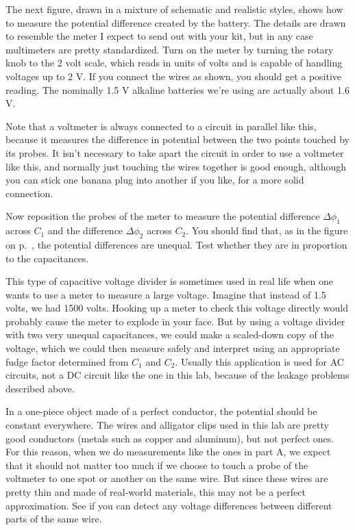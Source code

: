 The next figure, drawn in a mixture of schematic and realistic styles,
shows how to measure the potential difference created by the
battery. The details are drawn to resemble the meter I expect to send out with
your kit, but in any case multimeters are pretty standardized. Turn on the
meter by turning the rotary knob to the 2 volt scale, which reads in units of
volts and is capable of handling voltages up to 2 V. If you connect the wires
as shown, you should get a positive reading. The nominally 1.5 V alkaline batteries
we're using are actually about 1.6 V.


Note that a voltmeter is always connected to a circuit in parallel like this,
because it measures the difference in potential between the two points touched
by its probes. It isn't necessary to take apart the circuit in order to use
a voltmeter like this, and normally just touching the wires together is good
enough, although you can stick one banana plug into another if you like, for
a more solid connection.

Now reposition the probes of the meter to measure the potential difference
$\Delta\phi_1$ across $C_1$ and the difference $\Delta\phi_2$ across $C_2$.
You should find that, as in the  figure on p.~\pageref{fig:em-fie-covid-capacitor-params}, the potential
differences are unequal. Test whether they are in proportion to the capacitances.

This type of capacitive voltage divider is sometimes used in real life when
one wants to use a meter to measure a large voltage. Imagine that instead of
1.5 volts, we had 1500 volts. Hooking up a meter to check this voltage directly would probably cause
the meter to explode in your face. But by using a voltage divider with two very
unequal capacitances, we could make a scaled-down copy of the voltage, which we
could then measure safely and interpret using an appropriate fudge factor determined from $C_1$ and $C_2$.
Usually this application is used for AC circuits, not a DC circuit
like the one in this lab, because of the leakage problems described above.


In a one-piece object made of a perfect conductor, the potential should be constant everywhere.
The wires and alligator clips used in this lab are pretty good conductors (metals
such as copper and aluminum), but not perfect ones. For this reason, when we do
measurements like the ones in part A, we expect that it should
not matter too much if we choose to touch a probe of the voltmeter to one spot or another
on the same wire. But since these wires are pretty thin and made of real-world materials,
this may not be a perfect approximation. See if you can detect any voltage differences
between different parts of the same wire. 


